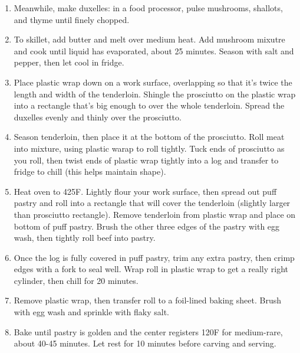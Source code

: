 \documentclass[11pt, twoside, openany]{book}
\begin{document}
\begin{minipage}[t]{\linewidth}
\begin{enumerate}
\item Meanwhile, make duxelles: in a food processor, pulse mushrooms, shallots, and thyme until finely chopped.
\item To skillet, add butter and melt over medium heat. Add mushroom mixutre and cook until liquid has evaporated, about 25 minutes. Season with salt and pepper, then let cool in fridge.
\item Place plastic wrap down on a work surface, overlapping so that it's twice the length and width of the tenderloin. Shingle the prosciutto on the plastic wrap into a rectangle that's big enough to over the whole tenderloin. Spread the duxelles evenly and thinly over the prosciutto.
\item Season tenderloin, then place it at the bottom of the prosciutto. Roll meat into mixture, using plastic warap to roll tightly. Tuck ends of prosciutto as you roll, then twist ends of plastic wrap tightly into a log and transfer to fridge to chill (this helps maintain shape).
\item Heat oven to 425F. Lightly flour your work surface, then spread out puff pastry and roll into a rectangle that will cover the tenderloin (slightly larger than prosciutto rectangle). Remove tenderloin from plastic wrap and place on bottom of puff pastry. Brush the other three edges of the pastry with egg wash, then tightly roll beef into pastry.
\item Once the log is fully covered in puff pastry, trim any extra pastry, then crimp edges with a fork to seal well. Wrap roll in plastic wrap to get a really right cylinder, then chill for 20 minutes.
\item Remove plastic wrap, then transfer roll to a foil-lined baking sheet. Brush with egg wash and sprinkle with flaky salt.
\item Bake until pastry is golden and the center registers 120F for medium-rare, about 40-45 minutes. Let rest for 10 minutes before carving and serving.
\end{enumerate}
\end{minipage}\vspace{8mm}
\end{document}

